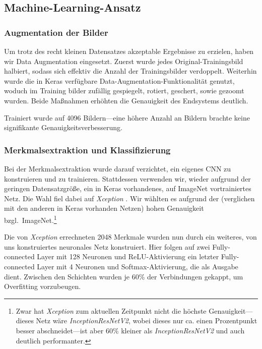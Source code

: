 \documentclass[a4,german]{article}
\begin{document}
\subsection{Machine-Learning-Ansatz}

\subsubsection{Augmentation der Bilder}
\label{sec:augmentation}

Um trotz des recht kleinen Datensatzes akzeptable Ergebnisse zu erzielen, haben wir Data Augmentation eingesetzt.
Zuerst wurde jedes Original-Trainingsbild halbiert, sodass sich effektiv die Anzahl der Trainingsbilder verdoppelt.
Weiterhin wurde die in Keras verfügbare Data-Augmentation-Funktionalität genutzt, woduch im Training bilder zufällig gespiegelt, rotiert, geschert, sowie gezoomt wurden.
Beide Maßnahmen erhöhten die Genauigkeit des Endsystems deutlich.

Trainiert wurde auf 4096 Bildern---eine höhere Anzahl an Bildern brachte keine signifikante Genauigkeitsverbesserung.


\subsubsection{Merkmalsextraktion und Klassifizierung}
\label{sec:neural}

Bei der Merkmalsextraktion wurde darauf verzichtet, ein eigenes CNN zu konstruieren und zu trainieren.
Stattdessen verwenden wir, wieder aufgrund der geringen Datensatzgröße, ein in Keras vorhandenes, auf ImageNet vortrainiertes Netz.
Die Wahl fiel dabei auf \emph{Xception} \cite{xception}.
Wir wählten es aufgrund der (verglichen mit den anderen in Keras vorhanden Netzen) hohen Genauigkeit bzgl.\ ImageNet.\footnote{Zwar hat \emph{Xception} zum aktuellen Zeitpunkt nicht die höchste Genauigkeit---dieses Netz wäre \emph{InceptionResNetV2}, wobei dieses nur ca. einen Prozentpunkt besser abschneidet---ist aber 60\% kleiner als \emph{InceptionResNetV2} und auch deutlich performanter.}

Die von \emph{Xception} errechneten 2048 Merkmale wurden nun durch ein weiteres, von uns konstruiertes neuronales Netz konstruiert.
Hier folgen auf zwei Fully-connected Layer mit 128 Neuronen und ReLU-Aktivierung ein letzter Fully-connected Layer mit 4 Neuronen und Softmax-Aktivierung, die als Ausgabe dient.
Zwischen den Schichten wurden je 60\% der Verbindungen gekappt, um Overfitting vorzubeugen.
\end{document}
